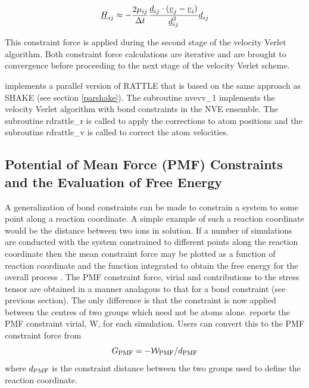 \begin{equation}
\mbox{$\underline{H}$}_{ij}\approx-\frac{2\mu_{ij}}{\Delta t}
\frac{\mbox{$\underline{d}$}_{ij}\cdot(\mbox{$\underline{v}$}_{j}-\mbox{$\underline{v}$}_{i})}{\mbox{$\underline{d}$}_{ij}^{2}}
\mbox{$\underline{d}$}_{ij}\label{hh12}
\end{equation}

This constraint force is applied during the second stage of the velocity
Verlet algorithm. Both constraint force calculations are iterative and
are brought to convergence before proceeding to the next stage of the
velocity Verlet scheme.

\D{} implements a parallel version of RATTLE that is based on the same
approach as SHAKE \cite{smith-94b} (see section \ref{parshake}).  The
subroutine {\sc nvevv\_1} implements the velocity Verlet
 algorithm with bond constraints in
the NVE ensemble. The subroutine {\sc rdrattle\_r} is called to apply
the corrections to atom positions and the subroutine {\sc rdrattle\_v}
is called to correct the atom velocities.

\subsection{Potential of Mean Force (PMF) Constraints and the Evaluation of Free Energy}
\label{PMF}

A generalization of bond constraints can be made to constrain a system
to some point along a reaction coordinate. A simple example of such a
reaction coordinate would be the distance between two ions in
solution. If a number of simulations are conducted with the system
constrained to different points along the reaction coordinate then the
mean constraint force may be plotted as a function of reaction
coordinate and the function integrated to obtain the free energy for
the overall process \cite{mccammon-87a}.  The PMF constraint force,
virial and contributions to the stress tensor are obtained in a manner
analagous to that for a bond constraint (see previous section). The
only difference is that the constraint is now applied between the
centres of two groups which need not be atoms alone.
\D{} reports the PMF constraint virial, {\cal W}, for each simulation. 
Users can convert this to the PMF constraint force from 
\[ G_{\rm PMF} = - {\cal W}_{\rm PMF} / d_{\rm PMF} \]
where $d_{\rm PMF}$ is the constraint distance between the two groups
used to define the reaction coordinate.

